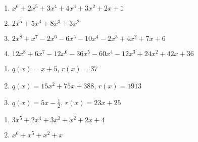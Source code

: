 \begin {enumerate} [(1)]
\item 
 $x^6+2x^5+3x^4+4x^3+3x^2+2x+1$
\item
 $2x^5+5x^4+8x^3+3x^2$
\item
$2x^8+x^7-2x^6-6x^5-10x^4-2x^3+4x^2+7x+6$
\item
$12x^8+6x^7-12x^6-36x^5-60x^4-12x^3+24x^2+42x+36$
\end {enumerate}

\begin {enumerate} [(1)]
\item 
 $q(x)=x+5$, $r(x)=37$
\item
 $q(x)=15x^2+75x+388$, $r(x)=1913$
\item
$q(x)=5x-\frac{1}{2}$, $r(x)=23x+25$
\end {enumerate}

\begin {enumerate} [(1)]
\item
$3x^5 + 2x^4 + 3x^3 + x^2 +2x +4$
\item
$x^6 + x^5 + x^2 + x$
\end {enumerate}













